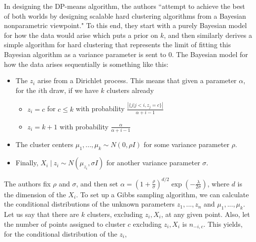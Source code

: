 \documentclass[11pt]{article}
\newcommand{\st}{ \; \big | \:}
\newcommand{\car}[1]{ \left\vert #1 \right\vert}
\theoremstyle{definition}
\begin{document}
In designing the DP-means algorithm, the authors ``attempt to achieve the best of both worlds by designing scalable hard clustering algorithms from a Bayesian nonparametric viewpoint." To this end, they start with a purely Bayesian model for how the data would arise which puts a prior on $k$, and then similarly derives a simple algorithm for hard clustering that represents the limit of fitting this Bayesian algorithm as a variance parameter is sent to 0. The Bayesian model for how the data arises sequentially is something like this: 
\begin{itemize}
    \item The $z_i$ arise from a Dirichlet process. This means that given a parameter $\alpha$, for the $i$th draw, if we have $k$ clusters already
        \begin{itemize}
            \item $z_i=c$ for $c\leq k$ with probability \(\frac{\car{\{ j\vert j<i, z_j=c\}}}{\alpha + i -1}\)
            \item $z_i=k+1$ with probability \(\frac{\alpha}{\alpha + i -1}\)
        \end{itemize}
    \item The cluster centers $\mu_1,...,\mu_k\sim N(0,\rho I)$ for some variance parameter $\rho$.
    \item Finally, \(X_i\st z_i \sim N(\mu_{z_i},\sigma I)\) for another variance parameter $\sigma$.
\end{itemize}
The authors fix $\rho$ and $\sigma$, and then set $\alpha=\left(1+\frac{\rho}{\sigma}\right)^{d/2}\exp\left(-\frac{\lambda}{2\sigma}\right)$, where $d$ is the dimension of the $X_i$. To set up a Gibbs sampling algorithm, we can calculate the conditional distributions of the unknown parameters $z_1,...,z_n$ and $\mu_1,...,\mu_k$. Let us say that there are $k$ clusters, excluding $z_i,X_i$, at any given point. Also, let the number of points assigned to cluster $c$ excluding $z_i,X_i$ is $n_{-i,c}$. This yields, for the conditional distribution of the $z_i$,
\end{document}
